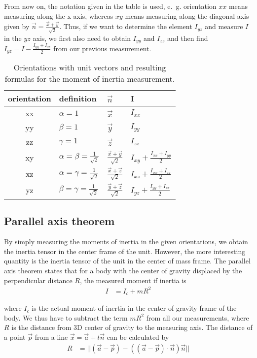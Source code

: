 \documentclass[journal]{IEEEtran}
\begin{document}
From now on, the notation given in the table is used, e.~g. orientation $xx$ means measuring along the x axis, whereas $xy$ means measuring along the diagonal axis given by $\vec{n} = \frac{\vec{x} + \vec{y}}{\sqrt{2}}$.
Thus, if we want to determine the element $I_{yz}$ and measure $I$ in the $yz$ axis, we first also need to obtain $I_{yy}$ and $I_{zz}$ and then find $I_{yz} = I - \frac{I_{yy} + I_{zz}}{2}$ from our previous measurement.

\begin{table}
	\centering
	\begin{tabular}{c | l l l}
		orientation	& definition	& $\vec{n}$	& I \\
		\hline
		xx & $\alpha = 1$							& $\vec{x}$								& $I_{xx}$ \\
		yy & $\beta = 1$							& $\vec{y}$								& $I_{yy}$ \\
		zz & $\gamma = 1$							& $\vec{z}$								& $I_{zz}$ \\
		xy & $\alpha = \beta = \frac{1}{\sqrt2}$	& $\frac{\vec{x} + \vec{y}}{\sqrt{2}}$	& $I_{xy} + \frac{I_{xx} + I_{yy}}{2}$ \\
		xz & $\alpha = \gamma = \frac{1}{\sqrt2}$	& $\frac{\vec{x} + \vec{z}}{\sqrt{2}}$	& $I_{xz} + \frac{I_{xx} + I_{zz}}{2}$ \\
		yz & $\beta = \gamma = \frac{1}{\sqrt2}$	& $\frac{\vec{y} + \vec{z}}{\sqrt{2}}$	& $I_{yz} + \frac{I_{yy} + I_{zz}}{2}$ \\
	\end{tabular}
	\caption{Orientations with unit vectors and resulting formulas for the moment of inertia measurement.}
	\label{tab:InertiaAxes}
\end{table}

\subsection{Parallel axis theorem}

By simply measuring the moments of inertia in the given orientations, we obtain the inertia tensor in the center frame of the unit.
However, the more interesting quantity is the inertia tensor of the unit in the center of mass frame.
The parallel axis theorem states that for a body with the center of gravity displaced by the perpendicular distance $R$, the measured moment if inertia is
\begin{align}
	I & = I_c + m R^2
\end{align}

where $I_c$ is the actual moment of inertia in the center of gravity frame of the body.
We thus have to subtract the term $m R^2$ from all our measurements, where $R$ is the distance from 3D center of gravity to the measuring axis.
The distance of a point $\vec{p}$ from a line $\vec{x} = \vec{a} + t \vec{n}$ can be calculated by
\begin{align}
	R & = || (\vec{a} - \vec{p}) - ( (\vec{a} - \vec{p}) \cdot \vec{n}) \vec{n} ||
\end{align}
\end{document}
